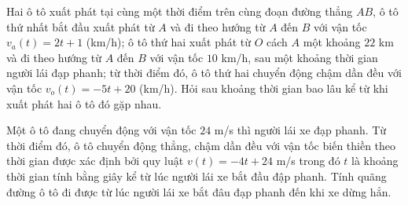 \begin{bt}%
	Hai ô tô xuất phát tại cùng một thời điểm trên cùng đoạn đường thẳng $A B$, ô tô thứ nhất bắt đầu xuất phát từ $A$ và đi theo hướng từ $A$ đến $B$ với vận tốc $v_a(t)=2 t+1$ (km/h); ô tô thứ hai xuất phát từ $O$ cách $A$ một khoảng $22$ km và đi theo hướng từ $A$ đến $B$ với vận tốc $10$ km/h, sau một khoảng thời gian người lái đạp phanh; từ thời điểm đó, ô tô thứ hai chuyển động chậm dần đều với vận tốc $v_o(t)=-5 t+20$ (km/h). Hỏi sau khoảng thời gian bao lâu kể từ khi xuất phát hai ô tô đó gặp nhau.
\end{bt}

\begin{bt}%

	Một ô tô đang chuyển động với vận tốc $24$ m/s thì người lái xe đạp phanh. Từ thời điểm đó, ô tô chuyển động thẳng, chậm dần đều với vận tốc biến thiền theo thời gian được xác định bởi quy luật $v(t)=-4t+24$ m/s trong đó $t$ là khoảng thời gian tính bằng giây kể từ lúc người lái xe bắt đầu đập phanh. Tính quãng đường ô tô đi được từ lúc người lái xe bắt đâu đạp phanh đến khi xe dừng hẳn.
\end{bt}

